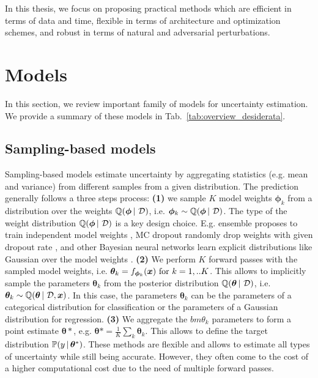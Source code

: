 In this thesis, we focus on proposing practical methods which are efficient in terms of data and time, flexible in terms of architecture and optimization schemes, and robust in terms of natural and adversarial perturbations.

\section{Models}

In this section, we review important family of models for uncertainty estimation. We provide a summary of these models in Tab.~\ref{tab:overview_desiderata}.

\subsection{Sampling-based models}

Sampling-based models estimate uncertainty by aggregating statistics (e.g. mean and variance) from different samples from a given distribution. The prediction generally follows a three steps process:
\textbf{(1)} we sample $K$ model weights $\bm{\phi}_k$ from a distribution over the weights $\operatorname{\mathbb{Q}}(\bm{\phi} \,|\, \operatorname{\mathcal{D}})$, i.e. $\bm{\phi}_k \sim \operatorname{\mathbb{Q}}(\bm{\phi} \,|\, \operatorname{\mathcal{D}})$. The type of the weight distribution $\operatorname{\mathbb{Q}}(\bm{\phi} \,|\, \operatorname{\mathcal{D}})$ is a key design choice. E.g. ensemble proposes to train independent model weights \cite{ensembles}, MC dropout randomly drop weights with given dropout rate \cite{dropout}, and other Bayesian neural networks learn explicit distributions like Gaussian over the model weights \cite{bayesian-networks}. \textbf{(2)} We perform $K$ forward passes with the sampled model weights, i.e. $\bm{\theta}_k = f_{\bm{\phi}_k}(\bm{x}) \text{ for } k=1,..K$. This allows to implicitly sample the parameters $\bm{\theta}_k$ from the posterior distribution $\operatorname{\mathbb{Q}}(\bm{\theta} \,|\, \operatorname{\mathcal{D}})$, i.e. $\bm{\theta}_k \sim \operatorname{\mathbb{Q}}(\bm{\theta} \,|\, \operatorname{\mathcal{D}}, \bm{x})$. In this case, the parameters $\bm{\theta}_k$ can be the parameters of a categorical distribution for classification or the parameters of a Gaussian distribution for regression. \textbf{(3)} We aggregate the $bm{\theta}_k$ parameters to form a point estimate $\bm{\theta}*$, e.g. $\bm{\theta}*=\frac{1}{K}\sum_k \bm{\theta}_k$. This allows to define the target distribution $\mathbb{P}(y \,|\, \bm{\theta}^*)$. These methods are flexible and allows to estimate all types of uncertainty while still being accurate. However, they often come to the cost of a higher computational cost due to the need of multiple forward passes.

